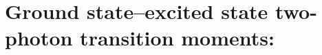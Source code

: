 
\section{Ground state--excited state two-photon transition moments:
} \label{sec:ccsm}

\begin{description}
\item[] 
%
\item[] 
%
\item[] 
%
\item[] 
%
\item[] 
%
\end{description}
